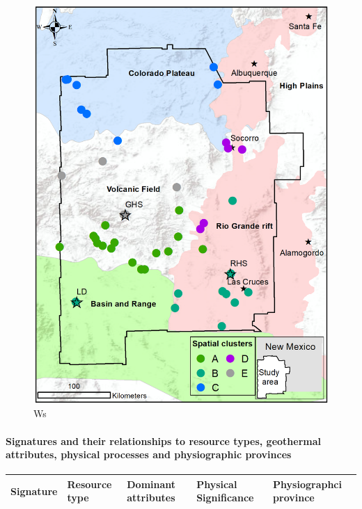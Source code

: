\documentclass[11pt]{article}
\begin{document}
\begin{figure}
\centering
\includegraphics{../figures-case01/nmfk5.png}
\caption{Ws}
\end{figure}

    \hypertarget{signatures-and-their-relationships-to-resource-types-geothermal-attributes-physical-processes-and-physiographic-provinces}{%
\paragraph{Signatures and their relationships to resource types,
geothermal attributes, physical processes and physiographic
provinces}\label{signatures-and-their-relationships-to-resource-types-geothermal-attributes-physical-processes-and-physiographic-provinces}}

\begin{longtable}[]{@{}
  >{\raggedright\arraybackslash}p{}
  >{\raggedright\arraybackslash}p{}
  >{\raggedright\arraybackslash}p{}
  >{\raggedright\arraybackslash}p{}
  >{\raggedright\arraybackslash}p{}@{}}
\toprule
Signature & Resource type & Dominant attributes & Physical Significance
& Physiographci province \\
\midrule
\endhead
\bottomrule
\end{longtable}
\end{document}
